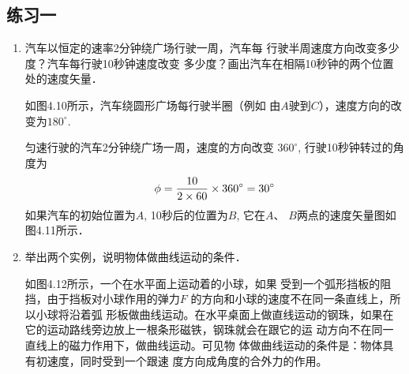 \subsection{练习一}
\begin{enumerate}
\item 汽车以恒定的速率2分钟绕广场行驶一周，汽车每
行驶半周速度方向改变多少度？汽车每行驶10秒钟速度改变
多少度？画出汽车在相隔10秒钟的两个位置处的速度矢量．

\begin{solution}
    如图4.10所示，汽车绕圆形广场每行驶半圈（例如
由$A$驶到$C$），速度方向的改变为$180^{\circ}$.

匀速行驶的汽车2分钟绕广场一周，速度的方向改变
$360^{\circ}$, 行驶10秒钟转过的角度为
\[\phi=\frac{10}{2\times 60}\times 360^{\circ}=30^{\circ}\]
如果汽车的初始位置为$A$, 10秒后的位置为$B$, 它在$A$、
$B$两点的速度矢量图如图4.11所示．
\begin{figure}[htp]\centering
    \begin{minipage}[t]{0.48\textwidth}
    \centering
{}
    \caption{}
    \end{minipage}
    \begin{minipage}[t]{0.48\textwidth}
    \centering
{}
    \caption{}
    \end{minipage}
    \end{figure}

\end{solution}
\item 举出两个实例，说明物体做曲线运动的条件．

\begin{solution}
    如图4.12所示，一个在水平面上运动着的小球，如果
    受到一个弧形挡板的阻挡，由于挡板对小球作用的弹力$F$
的方向和小球的速度不在同一条直线上，所以小球将沿着弧
形板做曲线运动。在水平桌面上做直线运动的钢珠，如果在
它的运动路线旁边放上一根条形磁铁，钢珠就会在跟它的运
动方向不在同一直线上的磁力作用下，做曲线运动。可见物
体做曲线运动的条件是：物体具有初速度，同时受到一个跟速
度方向成角度的合外力的作用。


\end{solution}
\end{enumerate}
